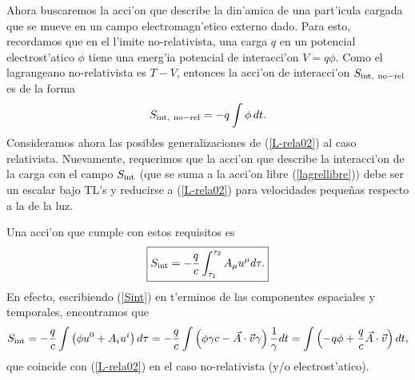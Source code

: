 Ahora buscaremos la acci'on que describe la din'amica de una part'icula cargada
que se mueve en un campo electromagn'etico externo dado. Para esto, recordamos
que en el l'imite no-relativista, una carga $q$ en un potencial electrost'atico
$\phi$ tiene una energ'ia potencial de interacci'on $V=q\phi$. Como el
lagrangeano no-relativista es $T-V$, entonces la acci'on de interacci'on $S_{\rm
int,\ no-rel}$ es de la forma
\begin{equation}
S_{\rm int,\ no-rel}= -q\int \phi\, dt. \label{L-rela02}%
\end{equation}
Consideramos ahora las posibles generalizaciones de (\ref{L-rela02}) al caso
relativista. Nuevamente, requerimos que la acci'on que describe la interacci'on
de la carga con el campo $S_{\rm int}$ (que se suma a la acci'on libre
(\ref{lagrellibre})) debe ser un escalar bajo TL's y reducirse a
(\ref{L-rela02}) para velocidades peque\~nas respecto a la de la luz.

Una acci'on que cumple con estos requisitos es
\begin{equation}
\boxed{S_{\rm int}=-\frac{q}{c}\int_{\tau_1}^{\tau_2}A_\mu u^\mu d\tau.}
\label{Sint}
\end{equation}
En efecto, escribiendo (\ref{Sint}) en t'erminos de las componentes espaciales y
temporales, encontramos que
\begin{equation}
S_{\rm int}=-\frac{q}{c}\int\left(  \phi u^0+A_i u^i\right)
d\tau=-\frac{q}{c}\int \left( \phi \gamma c-\vec{A}\cdot\vec{v}\gamma \right)
\frac{1}{\gamma}dt =\int \left(-q\phi+\frac{q}{c}\vec{A}\cdot\vec{v}\right) dt ,
\label{L-rela03b}%
\end{equation}
que coincide con (\ref{L-rela02}) en el caso no-relativista (y/o
electrost'atico).

